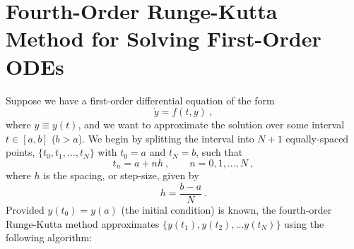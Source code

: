 \chapter{Fourth-Order Runge-Kutta Method for Solving First-Order ODEs}\label{app:runge-kutta}

Suppose we have a first-order differential equation of the form
%
%
\begin{equation}
    \dot y = f(t,y) \ ,
\end{equation}
%
%
where $y\equiv y(t)$, and we want to approximate the solution over some interval $t\in [a,b]$ ($b>a$).
We begin by splitting the interval into $N+1$ equally-spaced points, $\{t_0,t_1,\ldots,t_N\}$ with $t_0=a$ and $t_N=b$, such that
%
%
\begin{equation}
    t_n = a + nh \ , \qquad n = 0,1,\ldots, N \ , \label{eq:runge t_k}
\end{equation}
%
%
where $h$ is the spacing, or step-size, given by
%
%
\begin{equation}
    h = \frac{b-a}{N} \ .
\end{equation}
%
Provided $y(t_0)=y(a)$ (the initial condition) is known, the fourth-order
Runge-Kutta method approximates $\{ y(t_1),y(t_2),\ldots y(t_N)\}$ using the
following algorithm:~\cite{burden}


